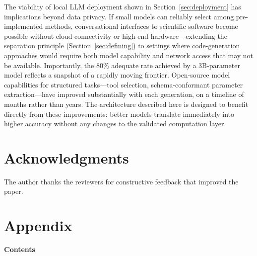 The viability of local LLM deployment shown in
Section~\ref{sec:deployment} has implications beyond data privacy.
If small models can reliably select among pre-implemented methods,
conversational interfaces to scientific software become possible
without cloud connectivity or high-end hardware---extending the
separation principle (Section~\ref{sec:defining}) to settings where
code-generation approaches would require both model capability and
network access that may not be available. Importantly, the 80\%
adequate rate achieved by a 3B-parameter model reflects a snapshot of
a rapidly moving frontier. Open-source model capabilities for
structured tasks---tool selection, schema-conformant parameter
extraction---have improved substantially with each generation, on a
timeline of months rather than years. The architecture described here
is designed to benefit directly from these improvements: better
models translate immediately into higher accuracy without any changes
to the validated computation layer.



\section*{Acknowledgments}

The author thanks the reviewers for constructive feedback that improved
the paper.



\clearpage
\appendix

\renewcommand{\thetable}{\Alph{section}.\arabic{table}}
\renewcommand{\thefigure}{\Alph{section}.\arabic{figure}}

\section*{Appendix}

\vspace{1em}
\noindent\textbf{Contents}
\vspace{0.5em}

